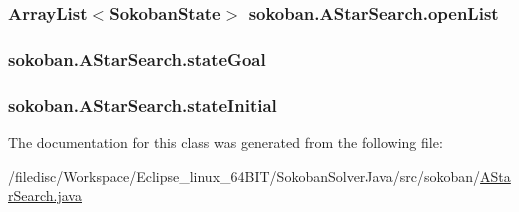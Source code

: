 \hypertarget{classsokoban_1_1AStarSearch_1f685c2127fec511adaca05855d3c6ae}{
\subsubsection[{openList}]{\setlength{\rightskip}{0pt plus 5cm}ArrayList$<${\bf SokobanState}$>$ {\bf sokoban.AStarSearch.openList}}}
\label{classsokoban_1_1AStarSearch_1f685c2127fec511adaca05855d3c6ae}


\hypertarget{classsokoban_1_1AStarSearch_b79570b0700c83ab7f3ef553923b5c00}{
\subsubsection[{stateGoal}]{ {\bf sokoban.AStarSearch.stateGoal}}}
\label{classsokoban_1_1AStarSearch_b79570b0700c83ab7f3ef553923b5c00}


\hypertarget{classsokoban_1_1AStarSearch_901a2b83227c005d77f95879e8059081}{
\subsubsection[{stateInitial}]{ {\bf sokoban.AStarSearch.stateInitial}}}
\label{classsokoban_1_1AStarSearch_901a2b83227c005d77f95879e8059081}




The documentation for this class was generated from the following file:\begin{CompactItemize}
\item 
/filedisc/Workspace/Eclipse\_\-linux\_\-64BIT/SokobanSolverJava/src/sokoban/\hyperlink{AStarSearch_8java}{AStarSearch.java}\end{CompactItemize}
